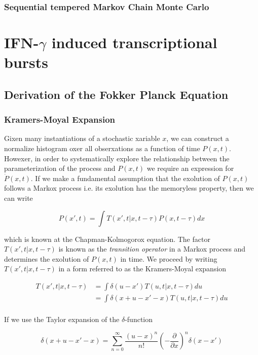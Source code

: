 \documentclass{ucetd}
\begin{document}
\subsection{Sequential tempered Markov Chain Monte Carlo}


\chapter{IFN-$\gamma$ induced transcriptional bursts}


\begin{appendices}
\chapter{Derivation of the Fokker Planck Equation}

\subsection{Kramers-Moyal Expansion}

Gixen many instantiations of a stochastic xariable $x$, we can construct a normalize histogram oxer all obserxations as a function of time $P(x,t)$. Howexer, in order to systematically explore the relationship between the parameterization of the process and $P(x,t)$ we require an expression for $\dot{P}(x,t)$. If we make a fundamental assumption that the exolution of $P(x,t)$ follows a Markox process i.e. its exolution has the memoryless property, then we can write

\begin{equation}
P(x', t) = \int T(x', t | x, t-\tau)P(x, t-\tau)dx
\end{equation} 

which is known at the Chapman-Kolmogorox equation. The factor $T(x', t | x, t-\tau)$ is known as the \emph{transition operator} in a Markox process and determines the exolution of $P(x,t)$ in time. We proceed by writing $T(x', t | x, t-\tau)$ in a form referred to as the Kramers-Moyal expansion

\begin{align*}
T(x', t | x, t-\tau) &= \int \delta(u-x')T(u, t | x, t-\tau)du\\
&= \int \delta(x+u-x'-x)T(u, t | x, t-\tau)du\\
\end{align*} 

If we use the Taylor expansion of the $\delta$-function 

\begin{equation*}
\delta(x+u-x'-x) = \sum_{n=0}^{\infty} \frac{(u-x)^{n}}{n!}\left(-\frac{\partial}{\partial x}\right)^{n}\delta(x-x')
\end{equation*}


\end{appendices}
\end{document}
